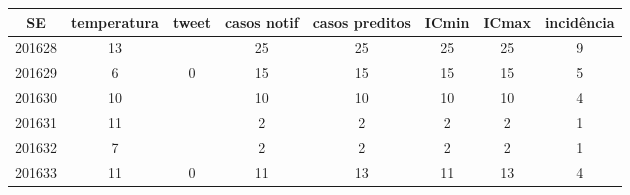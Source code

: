 \begin{tabular}{c|ccccccc}
  \hline
SE & temperatura & tweet & casos notif & casos preditos & ICmin & ICmax & incidência \\ 
  \hline
201628 & 13 &  & 25 & 25 & 25 & 25 & 9 \\ 
  201629 & 6 & 0 & 15 & 15 & 15 & 15 & 5 \\ 
  201630 & 10 &  & 10 & 10 & 10 & 10 & 4 \\ 
  201631 & 11 &  & 2 & 2 & 2 & 2 & 1 \\ 
  201632 & 7 &  & 2 & 2 & 2 & 2 & 1 \\ 
  201633 & 11 & 0 & 11 & 13 & 11 & 13 & 4 \\ 
   \hline
\end{tabular}
